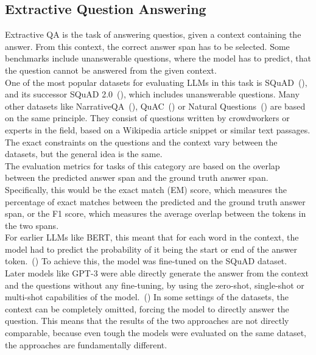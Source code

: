 \subsection{Extractive Question Answering}\label{extractive-qa}
Extractive QA is the task of answering questios, given a context containing the answer.
From this context, the correct answer span has to be selected.
Some benchmarks include unanswerable questions, where the model has to predict, that the question cannot be answered from the given context.
\\
One of the most popular datasets for evaluating LLMs in this task is SQuAD~(\cite{rajpurkar:2016}), and its successor SQuAD 2.0~(\cite{rajpurkar:2018}), which includes unanswerable questions.
Many other datasets like NarrativeQA~(\cite{kovcisky:2018}), QuAC~(\cite{choi:2018}) or Natural Questions~(\cite{kwiatkowski:2019}) are based on the same principle.
They consist of questions written by crowdworkers or experts in the field, based on a Wikipedia article snippet or similar text passages.
The exact constraints on the questions and the context vary between the datasets, but the general idea is the same.
\\
The evaluation metrics for tasks of this category are based on the overlap between the predicted answer span and the ground truth answer span.
Specifically, this would be the exact match (EM) score, which measures the percentage of exact matches between the predicted and the ground truth answer span, or the F1 score, which measures the average overlap between the tokens in the two spans.
\\
For earlier LLMs like BERT, this meant that for each word in the context, the model had to predict the probability of it being the start or end of the answer token.~(\cite{devlin:2018})
To achieve this, the model was fine-tuned on the SQuAD dataset. 
\\
Later models like GPT-3 were able directly generate the answer from the context and the questions without any fine-tuning, by using the zero-shot, single-shot or multi-shot capabilities of the model.~(\cite{brown:2020})
In some settings of the datasets, the context can be completely omitted, forcing the model to directly answer the question.
This means that the results of the two approaches are not directly comparable, because even tough the models were evaluated on the same dataset, the approaches are fundamentally different.

